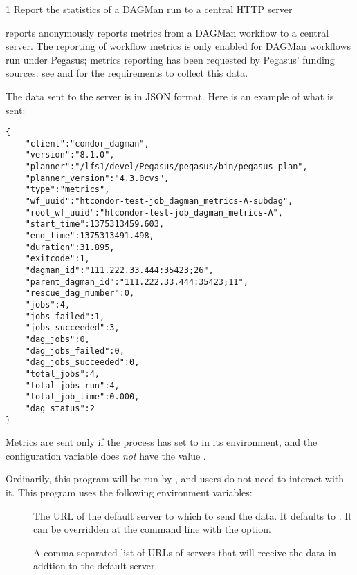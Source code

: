 \begin{ManPage}{\label{man-condor-dagman-metrics-reporter}}{1}
{Report the statistics of a DAGMan run to a central HTTP server}


\Synopsis {}

\Description

 reports anonymously reports metrics from
a DAGMan workflow to a central server.  The reporting of workflow metrics
is only enabled for DAGMan workflows run under Pegasus; metrics reporting
has been requested by Pegasus' funding sources:
see 
and 
for the requirements to collect this data.

The data sent to the server is in JSON format.  
Here is an example of what is sent:
\begin{verbatim}
{
    "client":"condor_dagman",
    "version":"8.1.0",
    "planner":"/lfs1/devel/Pegasus/pegasus/bin/pegasus-plan",
    "planner_version":"4.3.0cvs",
    "type":"metrics",
    "wf_uuid":"htcondor-test-job_dagman_metrics-A-subdag",
    "root_wf_uuid":"htcondor-test-job_dagman_metrics-A",
    "start_time":1375313459.603,
    "end_time":1375313491.498,
    "duration":31.895,
    "exitcode":1,
    "dagman_id":"111.222.33.444:35423;26",
    "parent_dagman_id":"111.222.33.444:35423;11",
    "rescue_dag_number":0,
    "jobs":4,
    "jobs_failed":1,
    "jobs_succeeded":3,
    "dag_jobs":0,
    "dag_jobs_failed":0,
    "dag_jobs_succeeded":0,
    "total_jobs":4,
    "total_jobs_run":4,
    "total_job_time":0.000,
    "dag_status":2
}
\end{verbatim}

Metrics are sent only if the  process has
 set to  in its environment,
and the  configuration variable does \emph{not}
have the value .

Ordinarily, this program will be run by , 
and users do not need to interact with it.
This program uses the following environment variables:
\begin{description}
  \item[]
    The URL of the default server to which to send the data.
    It defaults to .
    It can be overridden at the command line with the  option.
  \item[]
    A comma separated list of URLs of servers that will receive the
    data in addtion to the default server. 
\end{description}


\end{ManPage}
